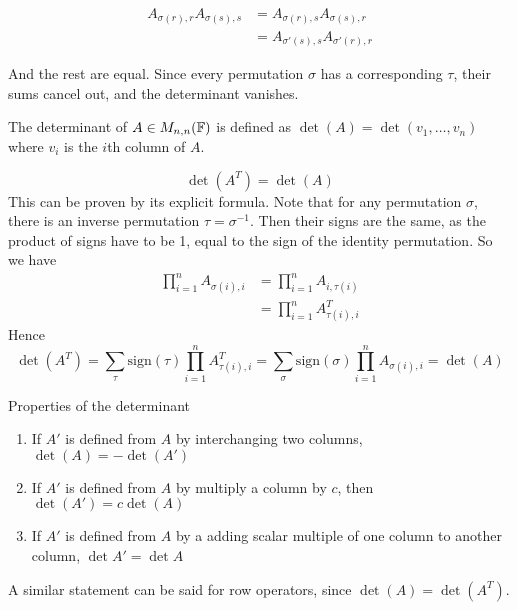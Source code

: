 \documentclass[12pt]{article}
\begin{document}
\begin{align*}
	A_{\sigma(r),r}A_{\sigma(s),s} &= A_{\sigma(r),s}A_{\sigma(s),r} \\
	&= A_{\sigma'(s),s}A_{\sigma'(r),r}
\end{align*}

And the rest are equal. Since every permutation $\sigma$ has a corresponding $\tau$, their sums cancel out, and the determinant vanishes.

\begin{defn}
	The determinant of $A \in M_{n,n}(\mathbb{F})$ is defined as $\det(A) = \det(v_1,\dots,v_n)$ where $v_i$ is the $i$th column of $A$.
\end{defn}

\begin{thm}
	$$\det(A^T) = \det(A)$$
	This can be proven by its explicit formula. Note that for any permutation $\sigma$, there is an inverse permutation $\tau = \sigma^{-1}$. Then their signs are the same, as the product of signs have to be 1, equal to the sign of the identity permutation. So we have
	\begin{align*}
		\prod_{i=1}^n A_{\sigma(i),i} &= \prod_{i=1}^n A_{i,\tau(i)} \\
					      &= \prod_{i=1}^n A^T_{\tau(i),i}
	\end{align*}
	Hence
	$$\det(A^T) = \sum_\tau \mathrm{sign}(\tau)\prod_{i=1}^n A^T_{\tau(i),i} = \sum_\sigma \mathrm{sign}(\sigma) \prod_{i=1}^n A_{\sigma(i),i} = \det(A)$$
\end{thm}

\begin{thm}
	Properties of the determinant
	\begin{enumerate}
		\item If $A'$ is defined from $A$ by interchanging two columns, $\det(A) = -\det(A')$
		\item If $A'$ is defined from $A$ by multiply a column by $c$, then $\det(A') = c\det(A)$
		\item If $A'$ is defined from $A$ by a adding scalar multiple of one column to another column, $\det{A'} = \det{A}$
	\end{enumerate}
	A similar statement can be said for row operators, since $\det(A) = \det(A^T)$.
\end{thm}
\end{document}
